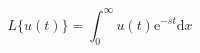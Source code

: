 \begin{equation}
    L\{u(t)\}=\int_{0}^{\infty} \! u(t)\mathrm{e}^{-st} \mathrm{d} x
    \label{eq:laplace}
\end{equation}
